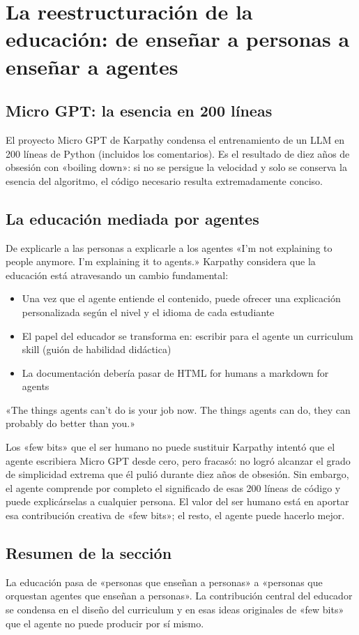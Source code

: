 \section{La reestructuración de la educación: de enseñar a personas a enseñar a agentes}

\subsection{Micro GPT: la esencia en 200 líneas}

El proyecto Micro GPT de Karpathy condensa el entrenamiento de un LLM en 200 líneas de Python (incluidos los comentarios). Es el resultado de diez años de obsesión con «boiling down»: si no se persigue la velocidad y solo se conserva la esencia del algoritmo, el código necesario resulta extremadamente conciso.

\subsection{La educación mediada por agentes}

\begin{importantbox}{De explicarle a las personas a explicarle a los agentes}
«I'm not explaining to people anymore. I'm explaining it to agents.» Karpathy considera que la educación está atravesando un cambio fundamental:
\begin{itemize}
    \item Una vez que el agente entiende el contenido, puede ofrecer una explicación personalizada según el nivel y el idioma de cada estudiante
    \item El papel del educador se transforma en: escribir para el agente un curriculum skill (guión de habilidad didáctica)
    \item La documentación debería pasar de HTML for humans a markdown for agents
\end{itemize}
«The things agents can't do is your job now. The things agents can do, they can probably do better than you.»
\end{importantbox}

\begin{knowledgebox}{Los «few bits» que el ser humano no puede sustituir}
Karpathy intentó que el agente escribiera Micro GPT desde cero, pero fracasó: no logró alcanzar el grado de simplicidad extrema que él pulió durante diez años de obsesión. Sin embargo, el agente comprende por completo el significado de esas 200 líneas de código y puede explicárselas a cualquier persona. El valor del ser humano está en aportar esa contribución creativa de «few bits»; el resto, el agente puede hacerlo mejor.
\end{knowledgebox}

\subsection{Resumen de la sección}

La educación pasa de «personas que enseñan a personas» a «personas que orquestan agentes que enseñan a personas». La contribución central del educador se condensa en el diseño del curriculum y en esas ideas originales de «few bits» que el agente no puede producir por sí mismo.


